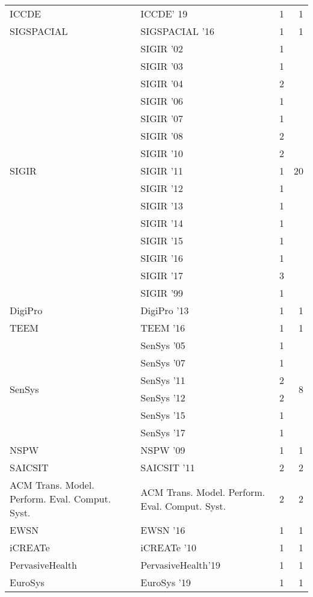 \begin{table*}[t]
\begin{tabular}{llrr}
\multirow{1}{*}{ICCDE} & ICCDE' 19 & 1 & \multirow{1}{*}{1}\\
\multirow{1}{*}{SIGSPACIAL } & SIGSPACIAL '16 & 1 & \multirow{1}{*}{1}\\
\multirow{15}{*}{SIGIR } & SIGIR '02 & 1 & \multirow{15}{*}{20}\\
& SIGIR '03 & 1 &\\
& SIGIR '04 & 2 &\\
& SIGIR '06 & 1 &\\
& SIGIR '07 & 1 &\\
& SIGIR '08 & 2 &\\
& SIGIR '10 & 2 &\\
& SIGIR '11 & 1 &\\
& SIGIR '12 & 1 &\\
& SIGIR '13 & 1 &\\
& SIGIR '14 & 1 &\\
& SIGIR '15 & 1 &\\
& SIGIR '16 & 1 &\\
& SIGIR '17 & 3 &\\
& SIGIR '99 & 1 &\\
\multirow{1}{*}{DigiPro } & DigiPro '13 & 1 & \multirow{1}{*}{1}\\
\multirow{1}{*}{TEEM } & TEEM '16 & 1 & \multirow{1}{*}{1}\\
\multirow{6}{*}{SenSys } & SenSys '05 & 1 & \multirow{6}{*}{8}\\
& SenSys '07 & 1 &\\
& SenSys '11 & 2 &\\
& SenSys '12 & 2 &\\
& SenSys '15 & 1 &\\
& SenSys '17 & 1 &\\
\multirow{1}{*}{NSPW } & NSPW '09 & 1 & \multirow{1}{*}{1}\\
\multirow{1}{*}{SAICSIT } & SAICSIT '11 & 2 & \multirow{1}{*}{2}\\
\multirow{1}{*}{ACM Trans. Model. Perform. Eval. Comput. Syst.} & ACM Trans. Model. Perform. Eval. Comput. Syst. & 2 & \multirow{1}{*}{2}\\
\multirow{1}{*}{EWSN } & EWSN '16 & 1 & \multirow{1}{*}{1}\\
\multirow{1}{*}{iCREATe } & iCREATe '10 & 1 & \multirow{1}{*}{1}\\
\multirow{1}{*}{PervasiveHealth} & PervasiveHealth'19 & 1 & \multirow{1}{*}{1}\\
\multirow{1}{*}{EuroSys } & EuroSys '19 & 1 & \multirow{1}{*}{1}\\

\end{tabular}
\end{table*}

